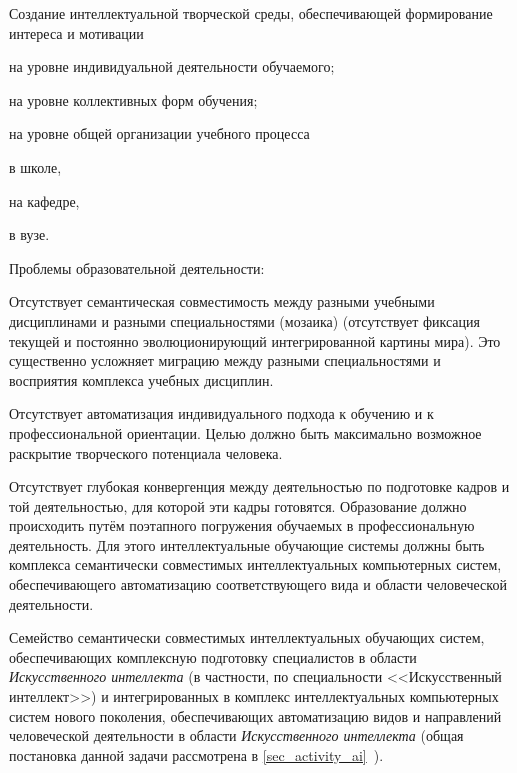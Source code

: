 Создание интеллектуальной творческой среды, обеспечивающей формирование интереса и мотивации
\begin{textitemize}
	\item на уровне индивидуальной деятельности обучаемого;
	\item на уровне коллективных форм обучения;
	\item на уровне общей организации учебного процесса
	\begin{textitemize}
		\item в школе,
		\item на кафедре,
		\item в вузе.
	\end{textitemize}
\end{textitemize}

Проблемы образовательной деятельности:
\begin{textitemize}
	\item Отсутствует семантическая совместимость между разными учебными дисциплинами и разными специальностями (мозаика) (отсутствует фиксация текущей и постоянно эволюционирующий интегрированной картины мира). Это существенно усложняет миграцию между разными специальностями и восприятия комплекса учебных дисциплин.
	\item Отсутствует автоматизация индивидуального подхода к обучению и к профессиональной ориентации. Целью должно быть максимально возможное раскрытие творческого потенциала  человека.
	\item Отсутствует глубокая конвергенция между деятельностью по подготовке кадров и той деятельностью, для которой эти кадры готовятся. Образование должно происходить путём поэтапного погружения обучаемых в  профессиональную деятельность. Для этого интеллектуальные обучающие системы должны быть  комплекса семантически совместимых интеллектуальных компьютерных систем, обеспечивающего автоматизацию соответствующего вида и области человеческой деятельности.
\end{textitemize}

Семейство семантически совместимых интеллектуальных обучающих систем, обеспечивающих комплексную подготовку специалистов в области \textit{Искусственного интеллекта} (в частности, по специальности <<Искусственный интеллект>>) и интегрированных в комплекс интеллектуальных компьютерных систем нового поколения, обеспечивающих  автоматизацию  видов и направлений человеческой деятельности в области \textit{Искусственного интеллекта} (общая постановка данной задачи рассмотрена в \ref{sec_activity_ai}~).

